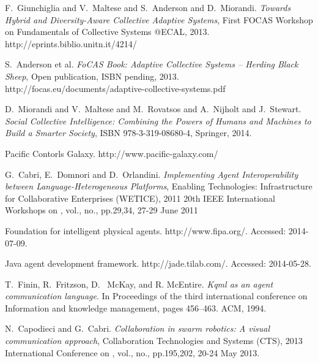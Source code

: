 \documentclass{llncs}
\begin{document}
\begin{thebibliography}{1}


F.~Giunchiglia and V.~Maltese and S.~Anderson and D.~Miorandi. \emph{Towards Hybrid and Diversity-Aware Collective Adaptive Systems}, First FOCAS Workshop on Fundamentals of Collective Systems @ECAL, 2013. http://eprints.biblio.unitn.it/4214/

S.~Anderson et al. \emph{FoCAS Book: Adaptive Collective Systems – Herding Black Sheep}, Open publication, ISBN pending, 2013. http://focas.eu/documents/adaptive-collective-systems.pdf

D.~Miorandi and V.~Maltese and M.~Rovatsos and A.~Nijholt and J.~Stewart. \emph{Social Collective Intelligence: Combining the Powers of Humans and Machines to Build a Smarter Society}, ISBN 978-3-319-08680-4, Springer, 2014.


Pacific Contorls Galaxy. http://www.pacific-galaxy.com/



G.~Cabri, E.~Domnori and D.~Orlandini. \emph{Implementing Agent Interoperability between Language-Heterogeneous Platforms}, Enabling Technologies: Infrastructure for Collaborative Enterprises (WETICE), 2011 20th IEEE International Workshops on , vol., no., pp.29,34, 27-29 June 2011

Foundation for intelligent physical agents. http://www.fipa.org/. Accessed: 2014-07-09.

Java agent development framework. http://jade.tilab.com/. Accessed: 2014-05-28.

T.~Finin, R.~Fritzson, D.~ McKay, and R. McEntire. \emph{Kqml as an agent communication language}. In Proceedings of the third international conference on Information and knowledge management, pages 456–463. ACM, 1994.

N.~Capodieci and G.~Cabri. \emph{Collaboration in swarm robotics: A visual communication approach}, Collaboration Technologies and Systems (CTS), 2013 International Conference on , vol., no., pp.195,202, 20-24 May 2013.


\end{thebibliography}
\end{document}

